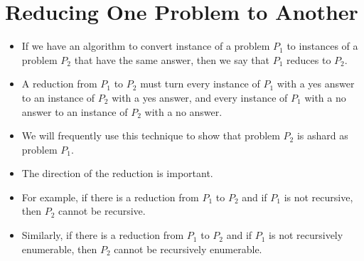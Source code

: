 \documentclass[]{article}
\begin{document}
\section{Reducing One Problem to Another}
\begin{itemize}
\item If we have an algorithm to convert instance of a problem $P_1$ to
instances of a problem $P_2$ that have the same answer, then we say that $P_1$
reduces to $P_2$.
\item A reduction from $P_1$ to $P_2$ must turn every instance of $P_1$ with a
yes answer to an instance of $P_2$ with a yes answer, and every instance of
$P_1$ with a no answer to an instance of $P_2$ with a no answer.
\item We will frequently use this technique to show that problem $P_2$ is ashard
as problem $P_1$.
\item The direction of the reduction is important.
\item For example, if there is a reduction from $P_1$ to $P_2$ and if $P_1$ is
not recursive, then $P_2$ cannot be recursive.
\item Similarly, if there is a reduction from $P_1$ to $P_2$ and if $P_1$ is not
recursively enumerable, then $P_2$ cannot be recursively enumerable.
\end{itemize}
\end{document}
